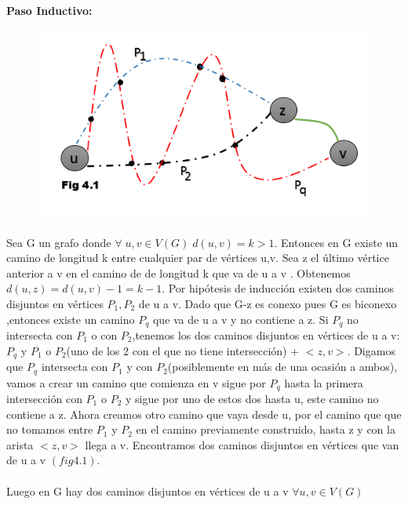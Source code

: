 \documentclass{article}
\begin{document}
    \noindent \textbf{Paso Inductivo:}\\
    \begin{figure}[H]
        \includegraphics[scale = 0.327]{img/4fig1.png}
        \centering
    \end{figure}
    \noindent Sea G un grafo donde $\forall\; u,v\in V(G)\; d(u,v)=k>1$. Entonces en G existe un camino de longitud k entre 
    cualquier par de v\'ertices u,v. Sea z el \'ultimo v\'ertice anterior a v en el camino de de longitud k que va de
    u a v . Obtenemos $d(u,z)=d(u,v)-1=k-1$. Por hip\'otesis de inducci\'on existen dos caminos disjuntos en v\'ertices 
    $P_{1},P_{2}$ de u a v. Dado que G-z es conexo pues G es biconexo ,entonces existe un camino $P_{q}$ que va de u a v
    y no contiene a z. Si $P_{q}$ no intersecta con $P_{1}$ o con $P_{2}$,tenemos los dos caminos disjuntos en v\'ertices
    de u a v: $P_{q}$ y $P_{1}$ o $P_{2}$(uno de los 2 con el que no tiene intersecci\'on) + $<z,v>$. Digamos que $P_{q}$ intersecta 
    con $P_{1}$ y con $P_{2}$(posiblemente en m\'as de una ocasi\'on  a ambos), vamos a crear un camino que comienza en v sigue por $P_{q}$ hasta la primera intersecci\'on con
    $P_{1}$ o $P_{2}$ y sigue por uno de estos dos hasta u, este camino no contiene a z. Ahora creamos  otro camino que vaya 
    desde u, por el camino que que no tomamos entre $P_{1}$ y $P_{2}$ en el camino previamente construido,  hasta z y con la arista $<z,v>$ llega 
    a v. Encontramos dos caminos disjuntos en v\'ertices que van de u a v $(fig4.1)$.\\\\
    Luego en G hay dos caminos disjuntos en v\'ertices de u a v $\forall u,v \in V(G)$\\\\
 
\end{document}
